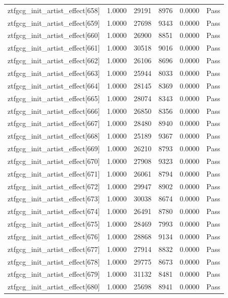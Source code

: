 \begin{table}[htbp]
\begin{tabular}{llrrll}
ztfgcg\_init\_artist\_effect[658] & 1.0000 & 29191 & 8976 & 0.0000 & Pass \\
ztfgcg\_init\_artist\_effect[659] & 1.0000 & 27698 & 9343 & 0.0000 & Pass \\
ztfgcg\_init\_artist\_effect[660] & 1.0000 & 26900 & 8851 & 0.0000 & Pass \\
ztfgcg\_init\_artist\_effect[661] & 1.0000 & 30518 & 9016 & 0.0000 & Pass \\
ztfgcg\_init\_artist\_effect[662] & 1.0000 & 26106 & 8696 & 0.0000 & Pass \\
ztfgcg\_init\_artist\_effect[663] & 1.0000 & 25944 & 8033 & 0.0000 & Pass \\
ztfgcg\_init\_artist\_effect[664] & 1.0000 & 28145 & 8369 & 0.0000 & Pass \\
ztfgcg\_init\_artist\_effect[665] & 1.0000 & 28074 & 8343 & 0.0000 & Pass \\
ztfgcg\_init\_artist\_effect[666] & 1.0000 & 26850 & 8356 & 0.0000 & Pass \\
ztfgcg\_init\_artist\_effect[667] & 1.0000 & 28480 & 8940 & 0.0000 & Pass \\
ztfgcg\_init\_artist\_effect[668] & 1.0000 & 25189 & 9367 & 0.0000 & Pass \\
ztfgcg\_init\_artist\_effect[669] & 1.0000 & 26210 & 8793 & 0.0000 & Pass \\
ztfgcg\_init\_artist\_effect[670] & 1.0000 & 27908 & 9323 & 0.0000 & Pass \\
ztfgcg\_init\_artist\_effect[671] & 1.0000 & 26061 & 8794 & 0.0000 & Pass \\
ztfgcg\_init\_artist\_effect[672] & 1.0000 & 29947 & 8902 & 0.0000 & Pass \\
ztfgcg\_init\_artist\_effect[673] & 1.0000 & 30038 & 8674 & 0.0000 & Pass \\
ztfgcg\_init\_artist\_effect[674] & 1.0000 & 26491 & 8780 & 0.0000 & Pass \\
ztfgcg\_init\_artist\_effect[675] & 1.0000 & 28469 & 7993 & 0.0000 & Pass \\
ztfgcg\_init\_artist\_effect[676] & 1.0000 & 28868 & 9134 & 0.0000 & Pass \\
ztfgcg\_init\_artist\_effect[677] & 1.0000 & 27914 & 8832 & 0.0000 & Pass \\
ztfgcg\_init\_artist\_effect[678] & 1.0000 & 29775 & 8673 & 0.0000 & Pass \\
ztfgcg\_init\_artist\_effect[679] & 1.0000 & 31132 & 8481 & 0.0000 & Pass \\
ztfgcg\_init\_artist\_effect[680] & 1.0000 & 25698 & 8941 & 0.0000 & Pass \\

\end{tabular}
\end{table}
